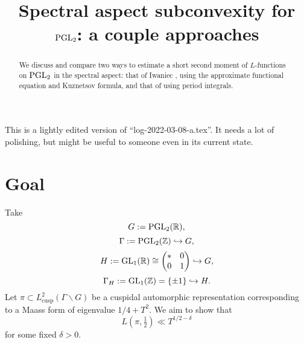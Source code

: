 \documentclass[reqno]{amsart} 
\title{Spectral aspect subconvexity for $\operatorname{PGL}_2$: a couple approaches}
\numberwithin{equation}{section}
\begin{document}
\maketitle
\tableofcontents


\begin{abstract}
  We discuss and compare two ways to estimate a short second moment of $L$-functions on $\operatorname{PGL}_2$ in the spectral aspect: that of Iwaniec \cite{Iwaniec1992}, using the approximate functional equation and Kuznetsov formula, and that of \cite{2021arXiv210915230N} using period integrals.
\end{abstract}

\begin{remark}
  This is a lightly edited version of ``log-2022-03-08-a.tex''.  It needs a lot of polishing, but might be useful to someone even in its current state.
\end{remark}

\section{Goal}\label{sec:org64b74bb}
Take
\begin{equation*}
G := \operatorname{PGL}_2(\mathbb{R}),
\end{equation*}
\begin{equation*}
\Gamma := \operatorname{PGL}_2(\mathbb{Z}) \hookrightarrow G,
\end{equation*}
\begin{equation*}
  H := \operatorname{GL}_1(\mathbb{R}) \cong  \begin{pmatrix} \ast & 0 \\ 0 & 1 \end{pmatrix} \hookrightarrow G,
\end{equation*}
\begin{equation*}
\Gamma_H := \operatorname{GL}_1(\mathbb{Z}) = \{\pm 1\} \hookrightarrow  H.
\end{equation*}
Let $\pi \subset L^2_{\text{cusp}}(\Gamma \backslash G)$ be a cuspidal automorphic representation corresponding to a Maass form of eigenvalue $1/4 + T^2$.  We aim to show that
\begin{equation}\label{eqn:35ac318817}
  L(\pi,\tfrac{1}{2}) \ll T^{1/2 - \delta}
\end{equation}
for some fixed $\delta > 0$.
\end{document}
